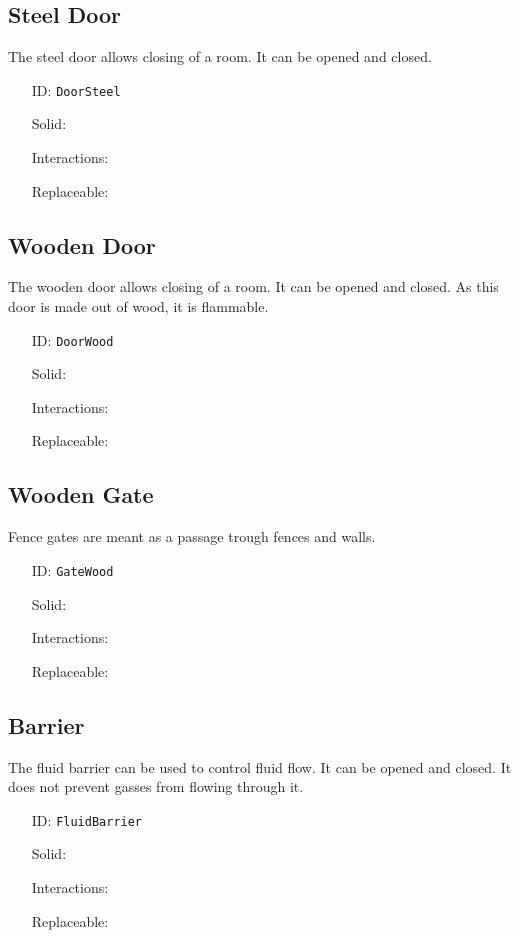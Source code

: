 \subsection{Steel Door}\label{subsec:blocks_steel door}
The steel door allows closing of a room. It can be opened and closed.
\newline
\begin{itemize}[nosep]
    \item[ID:] \texttt{DoorSteel}
    \item[Solid:]  \Checkmark \item[Interactions:]  \Checkmark \item[Replaceable:]  \XSolidBrush
\end{itemize}

\subsection{Wooden Door}\label{subsec:blocks_wooden door}
The wooden door allows closing of a room. It can be opened and closed.
As this door is made out of wood, it is flammable.
\newline
\begin{itemize}[nosep]
    \item[ID:] \texttt{DoorWood}
    \item[Solid:]  \Checkmark \item[Interactions:]  \Checkmark \item[Replaceable:]  \XSolidBrush
\end{itemize}

\subsection{Wooden Gate}\label{subsec:blocks_wooden gate}
Fence gates are meant as a passage trough fences and walls.
\newline
\begin{itemize}[nosep]
    \item[ID:] \texttt{GateWood}
    \item[Solid:]  \Checkmark \item[Interactions:]  \Checkmark \item[Replaceable:]  \XSolidBrush
\end{itemize}

\subsection{Barrier}\label{subsec:blocks_barrier}
The fluid barrier can be used to control fluid flow. It can be opened and closed.
It does not prevent gasses from flowing through it.
\newline
\begin{itemize}[nosep]
    \item[ID:] \texttt{FluidBarrier}
    \item[Solid:]  \Checkmark \item[Interactions:]  \Checkmark \item[Replaceable:]  \XSolidBrush
\end{itemize}

